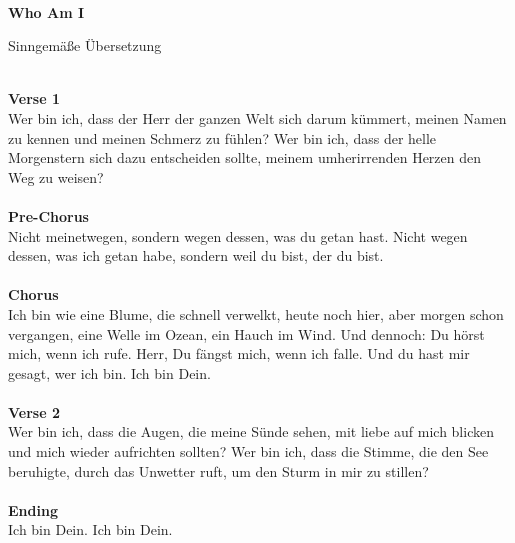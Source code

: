 \mbox{}\\
\huge\centerline{\textbf{Who Am I}}
\normalsize \centerline{Sinngemäße Übersetzung}
\mbox{}\\
\textbf{Verse 1}\\
Wer bin ich, dass der Herr der ganzen Welt sich darum kümmert, meinen Namen zu kennen und meinen Schmerz zu fühlen? Wer bin ich, dass der helle Morgenstern sich dazu entscheiden sollte, meinem umherirrenden Herzen den Weg zu weisen?\\
\\
\textbf{Pre-Chorus}\\
Nicht meinetwegen, sondern wegen dessen, was du getan hast. Nicht wegen dessen, was ich getan habe, sondern weil du bist, der du bist.\\
\\
\textbf{Chorus}\\
Ich bin wie eine Blume, die schnell verwelkt, heute noch hier, aber morgen schon vergangen, eine Welle im Ozean, ein Hauch im Wind. Und dennoch: Du hörst mich, wenn ich rufe. Herr, Du fängst mich, wenn ich falle. Und du hast mir gesagt, wer ich bin. Ich bin Dein.\\
\\
\textbf{Verse 2}\\
Wer bin ich, dass die Augen, die meine Sünde sehen, mit liebe auf mich blicken und mich wieder aufrichten sollten? Wer bin ich, dass die Stimme, die den See beruhigte, durch das Unwetter ruft, um den Sturm in mir zu stillen?\\
\\
\textbf{Ending}\\
Ich bin Dein. Ich bin Dein.

